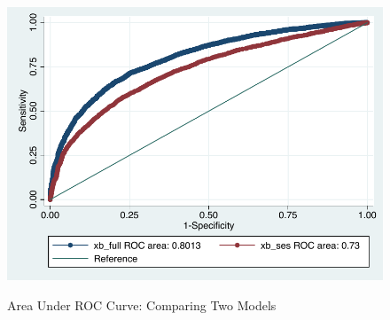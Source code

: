 \documentclass[12pt]{article}
\begin{document}
\begin{figure}
  \centering
  \caption{Area Under ROC Curve: Comparing Two Models}
 \includegraphics{roc_curve}
  \label{fig:roccurve}
\end{figure}
\end{document}
